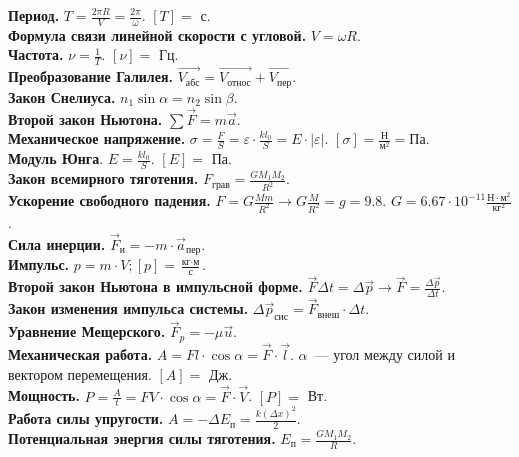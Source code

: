 \documentclass{article}
\begin{document}
	\textbf{Период.} $T = \frac{2 \pi R}{V} = \frac{2 \pi}{\omega}$. $[T] =$ с. \\
	\textbf{Формула связи линейной скорости с угловой.} $V = \omega R$. \\
	\textbf{Частота.} $\nu = \frac{1}{T}$. $[\nu] =$ Гц. \\
	\textbf{Преобразование Галилея.} $\vec{V_{\text{абс}}} = \vec{V_{\text{относ}}} + \vec{V_{\text{пер}}}$. \\
	\textbf{Закон Снелиуса.} $n_1 \sin\alpha = n_2 \sin\beta$. \\
	\textbf{Второй закон Ньютона.} $\sum\vec{F} = m\vec{a}$. \\
	\textbf{Механическое напряжение.} $\sigma = \frac{F}{S} = \varepsilon \cdot \frac{kl_0}{S} = E \cdot |\varepsilon|$. $[\sigma] = \frac{\text{Н}}{\text{м}^2} = \text{Па}$. \\
	\textbf{Модуль Юнга}. $E = \frac{kl_0}{S}$. $[E] =$ Па. \\
	\textbf{Закон всемирного тяготения.} $F_{\text{грав}} = \frac{GM_1M_2}{R^2}$. \\
	\textbf{Ускорение свободного падения.} $F = G \frac{Mm}{R^2} \rightarrow G \frac{M}{R^2} = g = 9.8$. $G = 6.67 \cdot 10^{-11} \frac{\text{Н} \cdot \text{м}^2}{\text{кг}^2}$. \\
	\textbf{Сила инерции.} $\vec{F}_{\text{и}} = -m \cdot \vec{a}_{\text{пер}}$. \\
	\textbf{Импульс.} $p = m \cdot V; [p] = \frac{\text{кг} \cdot \text{м}}{\text{с}}$. \\
	\textbf{Второй закон Ньютона в импульсной форме.} $\vec{F} \varDelta t = \varDelta \vec{p} \rightarrow \vec{F} = \frac{\varDelta \vec{p}}{\varDelta t}$. \\
	\textbf{Закон изменения импульса системы.} $\varDelta \vec{p}_{\text{сис}} = \vec{F}_{\text{внеш}} \cdot \varDelta t$. \\
	\textbf{Уравнение Мещерского.} $\vec{F}_{p} = -\mu \vec{u}$. \\
	\textbf{Механическая работа.} $A = Fl \cdot \cos \alpha = \vec{F} \cdot \vec{l}$. $\alpha$~--- угол между силой и вектором перемещения. $[A] =$ Дж. \\
	\textbf{Мощность.} $P = \frac{A}{t} = FV \cdot \cos \alpha = \vec{F} \cdot \vec{V}$. $[P] =$ Вт. \\
	\textbf{Работа силы упругости.} $A = -\varDelta E_{\text{п}} = \frac{k (\varDelta x)^2}{2}$. \\
	\textbf{Потенциальная энергия силы тяготения.}
	$E_{\text{п}} = \frac{GM_1M_2}{R}$. \\
\end{document}
